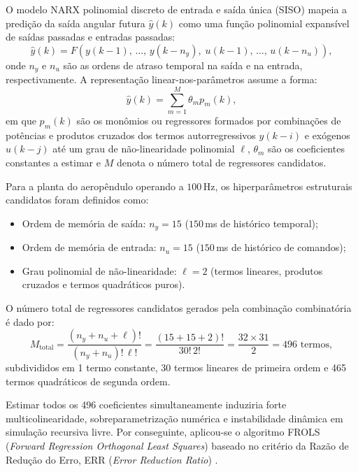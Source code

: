 O modelo NARX polinomial discreto de entrada e saída única (SISO) mapeia a predição da saída angular futura $\hat{y}(k)$ como uma função polinomial expansível de saídas passadas e entradas passadas:
\begin{equation}
    \hat{y}(k) = F\!\left(y(k-1),\,\ldots,\,y(k-n_y),\; u(k-1),\,\ldots,\,u(k-n_u)\right),
    \label{eq:narx_geral}
\end{equation}
\noindent onde $n_y$ e $n_u$ são as ordens de atraso temporal na saída e na entrada, respectivamente. A representação linear-nos-parâmetros assume a forma:
\begin{equation}
    \hat{y}(k) = \sum_{m=1}^{M} \theta_m p_m(k),
    \label{eq:narx_linear_parametros}
\end{equation}
\noindent em que $p_m(k)$ são os monômios ou regressores formados por combinações de potências e produtos cruzados dos termos autorregressivos $y(k-i)$ e exógenos $u(k-j)$ até um grau de não-linearidade polinomial $\ell$, $\theta_m$ são os coeficientes constantes a estimar e $M$ denota o número total de regressores candidatos.

Para a planta do aeropêndulo operando a $100$\,Hz, os hiperparâmetros estruturais candidatos foram definidos como:
\begin{itemize}
    \item Ordem de memória de saída: $n_y = 15$ ($150$\,ms de histórico temporal);
    \item Ordem de memória de entrada: $n_u = 15$ ($150$\,ms de histórico de comandos);
    \item Grau polinomial de não-linearidade: $\ell = 2$ (termos lineares, produtos cruzados e termos quadráticos puros).
\end{itemize}

O número total de regressores candidatos gerados pela combinação combinatória é dado por:
\begin{equation}
    M_{\text{total}} = \frac{(n_y + n_u + \ell)!}{(n_y + n_u)!\,\ell!} = \frac{(15 + 15 + 2)!}{30!\,2!} = \frac{32 \times 31}{2} = 496 \text{ termos},
\end{equation}
\noindent subdivididos em 1 termo constante, 30 termos lineares de primeira ordem e 465 termos quadráticos de segunda ordem.

Estimar todos os 496 coeficientes simultaneamente induziria forte multicolinearidade, sobreparametrização numérica e instabilidade dinâmica em simulação recursiva livre. Por conseguinte, aplicou-se o algoritmo FROLS (\textit{Forward Regression Orthogonal Least Squares}) baseado no critério da Razão de Redução do Erro, ERR (\textit{Error Reduction Ratio}) \cite{chen1989}.

